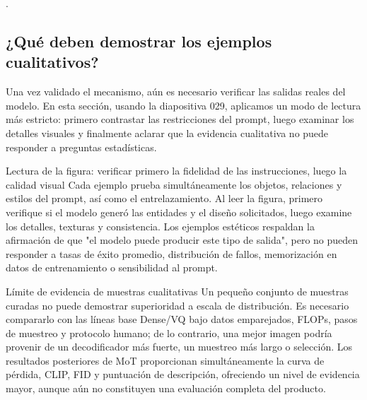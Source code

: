 .

\subsection{¿Qué deben demostrar los ejemplos cualitativos?}

Una vez validado el mecanismo, aún es necesario verificar las salidas reales del modelo. En esta sección, usando la diapositiva 029, aplicamos un modo de lectura más estricto: primero contrastar las restricciones del prompt, luego examinar los detalles visuales y finalmente aclarar que la evidencia cualitativa no puede responder a preguntas estadísticas.


\begin{knowledgebox}{Lectura de la figura: verificar primero la fidelidad de las instrucciones, luego la calidad visual}
Cada ejemplo prueba simultáneamente los objetos, relaciones y estilos del prompt, así como el entrelazamiento. Al leer la figura, primero verifique si el modelo generó las entidades y el diseño solicitados, luego examine los detalles, texturas y consistencia. Los ejemplos estéticos respaldan la afirmación de que "el modelo puede producir este tipo de salida", pero no pueden responder a tasas de éxito promedio, distribución de fallos, memorización en datos de entrenamiento o sensibilidad al prompt.
\end{knowledgebox}

\begin{warningbox}{Límite de evidencia de muestras cualitativas}
Un pequeño conjunto de muestras curadas no puede demostrar superioridad a escala de distribución. Es necesario compararlo con las líneas base Dense/VQ bajo datos emparejados, FLOPs, pasos de muestreo y protocolo humano; de lo contrario, una mejor imagen podría provenir de un decodificador más fuerte, un muestreo más largo o selección. Los resultados posteriores de MoT proporcionan simultáneamente la curva de pérdida, CLIP, FID y puntuación de descripción, ofreciendo un nivel de evidencia mayor, aunque aún no constituyen una evaluación completa del producto.
\end{warningbox}

